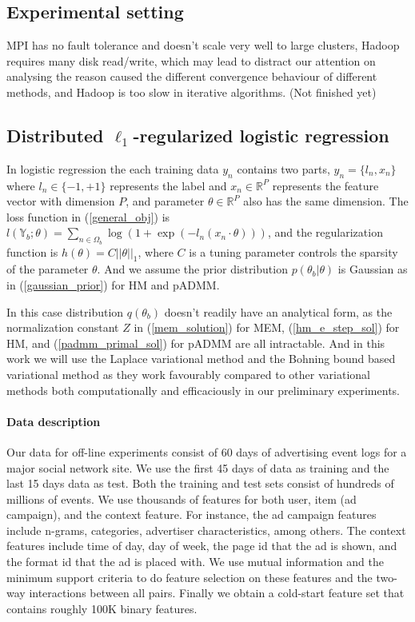 \documentclass{article}
\newcommand{\1}[0]{\ensuremath{\boldsymbol{1}}\xspace}
\begin{document}
\subsection{Experimental setting}

MPI has no fault tolerance and doesn't scale very well to large clusters, Hadoop requires many disk read/write, which may lead to distract our attention on analysing the reason caused the different convergence behaviour of different methods, and Hadoop is too slow in iterative algorithms. (Not finished yet)

\subsection{Distributed $\ell_1$-regularized logistic regression}
In logistic regression the each training data $y_n$ contains two parts, $y_n = \{l_n, x_n\}$ where $l_n \in \{-1, +1\}$ represents the label and $x_n \in \mathbb{R}^P$ represents the feature vector with dimension $P$, and parameter $\theta\in\mathbb{R}^P$ also has the same dimension. The loss function in (\ref{general_obj}) is $l(\mathbb{Y}_b; \theta) = \sum_{n\in\Omega_b}\log(1+\exp(-l_n(x_n\cdot\theta)))$, and the regularization function is $h(\theta) = C||\theta||_1$, where $C$ is a tuning parameter controls the sparsity of the parameter $\theta$. And we assume the prior distribution $p(\theta_b|\theta)$ is Gaussian as in (\ref{gaussian_prior}) for HM and pADMM. 

In this case distribution $q(\theta_b)$ doesn't readily have an analytical form, as the normalization constant $Z$ in (\ref{mem_solution}) for MEM, (\ref{hm_e_step_sol}) for HM, and (\ref{padmm_primal_sol}) for pADMM are all intractable. And in this work we will use the Laplace variational method \cite{Wang2013} and the Bohning bound based variational method \cite{Khan2010} as they work favourably compared to other variational methods both computationally and efficaciously in our preliminary experiments.

\paragraph{Data description} Our data for off-line experiments consist of 60 days of advertising event logs for a major social network site. We use the first 45 days of data as training and the last 15 days data as test. Both the training and test sets consist of hundreds of millions of events. We use thousands of features for both user, item (ad campaign), and the context feature. For instance, the ad campaign features include n-grams, categories, advertiser characteristics, among others. The context features include time of day, day of week, the page id that the ad is shown, and the format id that the ad is placed with. We use mutual information and the minimum support criteria to do feature selection on these features and the two-way interactions between all pairs. Finally we obtain a cold-start feature set that contains roughly 100K binary features.
\end{document}

